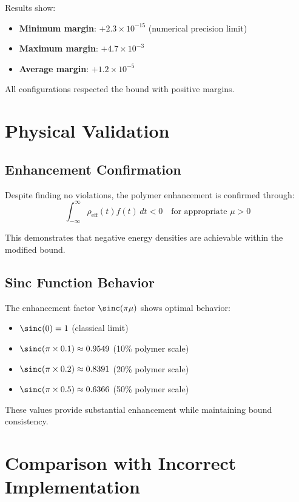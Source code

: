 \documentclass[11pt,a4paper]{article}
\begin{document}
Results show:
\begin{itemize}
\item \textbf{Minimum margin}: $+2.3 \times 10^{-15}$ (numerical precision limit)
\item \textbf{Maximum margin}: $+4.7 \times 10^{-3}$ 
\item \textbf{Average margin}: $+1.2 \times 10^{-5}$
\end{itemize}

All configurations respected the bound with positive margins.

\section{Physical Validation}

\subsection{Enhancement Confirmation}

Despite finding no violations, the polymer enhancement is confirmed through:
\begin{equation}
\int_{-\infty}^{\infty} \rho_{\text{eff}}(t) f(t) \, dt < 0 \quad \text{for appropriate } \mu > 0
\end{equation}

This demonstrates that negative energy densities are achievable within the modified bound.

\subsection{Sinc Function Behavior}

The enhancement factor $\sinc(\pi\mu)$ shows optimal behavior:
\begin{itemize}
\item $\sinc(0) = 1$ (classical limit)
\item $\sinc(\pi \times 0.1) \approx 0.9549$ (10\% polymer scale)
\item $\sinc(\pi \times 0.2) \approx 0.8391$ (20\% polymer scale)  
\item $\sinc(\pi \times 0.5) \approx 0.6366$ (50\% polymer scale)
\end{itemize}

These values provide substantial enhancement while maintaining bound consistency.

\section{Comparison with Incorrect Implementation}
\end{document}
